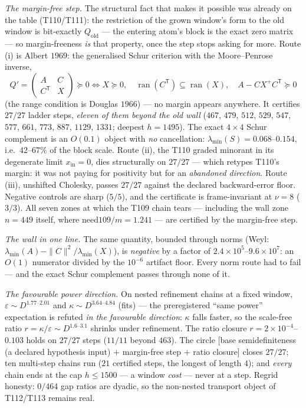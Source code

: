 \documentclass[11pt,a4paper]{article}
\begin{document}
\emph{The margin-free step.} The structural fact that makes it possible was already on the table
(T110/T111): the restriction of the grown window's form to the old window is bit-exactly
$Q_{\mathrm{old}}$ --- the entering atom's block is the exact zero matrix --- so margin-freeness
\emph{is} that property, once the step stops asking for more. Route (i) is Albert $1969$: the
generalised Schur criterion with the Moore--Penrose inverse,
\[
Q'=\begin{pmatrix}A & C\\ C^{\mathsf T} & X\end{pmatrix}\succeq0
\iff
X\succeq0,\quad \operatorname{ran}(C^{\mathsf T})\subseteq\operatorname{ran}(X),\quad
A-CX^{+}C^{\mathsf T}\succeq0
\]
(the range condition is Douglas $1966$) --- no margin appears anywhere. It certifies $27/27$
ladder steps, \emph{eleven of them beyond the old wall} ($467$, $479$, $512$, $529$, $547$,
$577$, $661$, $773$, $887$, $1129$, $1331$; deepest $h=1495$). The exact $4\times4$ Schur
complement is an $O(0.1)$ object with \emph{no} cancellation: $\lambda_{\min}(S)=0.068$--$0.154$,
i.e.\ $42$--$67\%$ of the block scale. Route (ii), the T110 graded minorant in its degenerate
limit $x_{\mathrm{in}}=0$, dies structurally on $27/27$ --- which retypes T110's margin: it was
not paying for positivity but for an \emph{abandoned direction}. Route (iii), unshifted Cholesky,
passes $27/27$ against the declared backward-error floor. Negative controls are sharp ($5/5$),
and the certificate is frame-invariant at $\nu=8$ ($3/3$). All seven zones at which the T109
chain tears --- including the wall zone $n=449$ itself, where $\mathrm{need109}/m=1.241$ --- are
certified by the margin-free step.

\emph{The wall in one line.} The same quantity, bounded through norms (Weyl:
$\lambda_{\min}(A)-\|C\|^2/\lambda_{\min}(X)$), is \emph{negative} by a factor of
$2.4\times10^{5}$--$9.6\times10^{7}$: an $O(1)$ numerator divided by the $10^{-6}$ artifact
floor. Every norm route had to fail --- and the exact Schur complement passes through none of it.

\emph{The favourable power direction.} On nested refinement chains at a fixed window,
$\varepsilon\sim D^{1.77\text{--}2.01}$ and $\kappa\sim D^{3.64\text{--}4.84}$ (fits) --- the
preregistered ``same power'' expectation is refuted \emph{in the favourable direction}: $\kappa$
falls faster, so the scale-free ratio $r=\kappa/\varepsilon\sim D^{1.6\text{--}3.1}$ shrinks
under refinement. The ratio closure $r=2\times10^{-4}$--$0.103$ holds on $27/27$ steps ($11/11$
beyond $463$). The circle [base semidefiniteness (a declared hypothesis input) $+$ margin-free
step $+$ ratio closure] closes $27/27$; ten multi-step chains run ($21$ certified steps, the
longest of length $4$); and \emph{every} chain ends at the cap $h\le1500$ --- a window
\emph{cost} --- never at a step. Regrid honesty: $0/464$ gap ratios are dyadic, so the
non-nested transport object of T112/T113 remains real.
\end{document}
